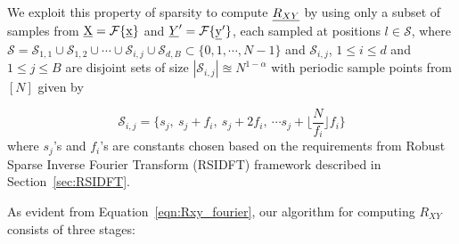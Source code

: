  We exploit this property of sparsity to compute $\underline{R_{XY}}$ by using only a subset of samples from $\underline{\mathrm{X}} = \mathcal{F}\{\underline{\mathrm{x}}\} $ and $\underline{Y}' = \mathcal{F}\{\underline{\mathrm{y}}'\} $, each sampled at positions $l \in \mathcal{S}$, where $\mathcal{S} = \mathcal{S}_{1,1} \cup \mathcal{S}_{1,2} \cup \cdots \cup \mathcal{S}_{i,j} \cup  \mathcal{S}_{d,B} \subset \{ 0,1,\cdots ,N-1 \}$ and $\mathcal{S}_{i,j}$, $1 \leq i \leq d $ and  $1 \leq j \leq B $ are disjoint sets of size $|\mathcal{S}_{i,j}| \approxeq N^{1-\alpha}$ with periodic sample points from $[N]$ given by 
 
 \begin{equation}
 \label{eqn:sampling_sets}\mathcal{S}_{i,j} = \{s_j,\ s_j + f_i,\ s_j + 2f_i,\ \cdots s_j + \lfloor{\frac{N}{f_i} }\rfloor f_i \}
 \end{equation}
   where $s_j$'s and $f_i$'s are constants chosen based on the requirements from Robust Sparse Inverse Fourier Transform (RSIDFT) framework described in Section~\ref{sec:RSIDFT}.

 As evident from Equation~\ref{eqn:Rxy_fourier}, our algorithm for computing $R_{XY}$ consists of three stages:

